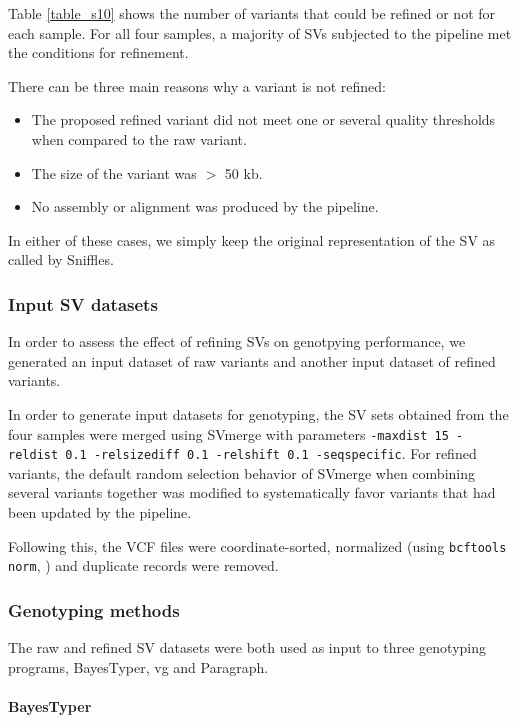 \documentclass[12pt]{article}
\begin{document}
Table \ref{table_s10} shows the number of variants that could be refined or not for each sample.
For all four samples, a majority of SVs subjected to the pipeline met the conditions for refinement.

There can be three main reasons why a variant is not refined:

\begin{itemize}
	\item The proposed refined variant did not meet one or several quality thresholds when compared to the raw variant.
	\item The size of the variant was $>$ 50 kb.
	\item No assembly or alignment was produced by the pipeline.
\end{itemize}

In either of these cases, we simply keep the original representation of the SV as called by Sniffles.

\subsubsection{Input SV datasets}

In order to assess the effect of refining SVs on genotpying performance, we generated an input dataset of raw variants and another input dataset of refined variants.

In order to generate input datasets for genotyping, the SV sets obtained from the four samples were merged using SVmerge \citep{svmerge} with parameters \texttt{-maxdist 15 -reldist 0.1 -relsizediff 0.1 -relshift 0.1 -seqspecific}.
For refined variants, the default random selection behavior of SVmerge when combining several variants together was modified to systematically favor variants that had been updated by the pipeline.

Following this, the VCF files were coordinate-sorted, normalized (using \texttt{bcftools norm}, \cite{bcftools}) and duplicate records were removed.

\subsubsection{Genotyping methods}

The raw and refined SV datasets were both used as input to three genotyping programs, BayesTyper, vg and Paragraph.

\paragraph{BayesTyper}
\end{document}
